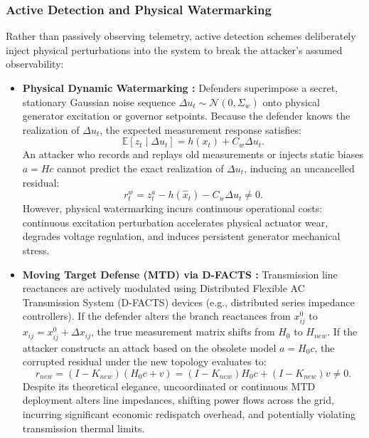 \documentclass[journal,compsoc]{IEEEtran}
\begin{document}
\subsubsection{Active Detection and Physical Watermarking}
Rather than passively observing telemetry, active detection schemes deliberately inject physical perturbations into the system to break the attacker's assumed observability:
\begin{itemize}
    \item \textbf{Physical Dynamic Watermarking \cite{ref4}:} Defenders superimpose a secret, stationary Gaussian noise sequence $\Delta u_t \sim \mathcal{N}(0, \Sigma_w)$ onto physical generator excitation or governor setpoints. Because the defender knows the realization of $\Delta u_t$, the expected measurement response satisfies:
    \begin{equation}
        \mathbb{E}[z_t \mid \Delta u_t] = h(x_t) + C_w \Delta u_t.
    \end{equation}
    An attacker who records and replays old measurements or injects static biases $a = Hc$ cannot predict the exact realization of $\Delta u_t$, inducing an uncancelled residual:
    \begin{equation}
        r_t^w = z_t^a - h(\hat{x}_t) - C_w \Delta u_t \ne 0.
    \end{equation}
    However, physical watermarking incurs continuous operational costs: continuous excitation perturbation accelerates physical actuator wear, degrades voltage regulation, and induces persistent generator mechanical stress.
    \item \textbf{Moving Target Defense (MTD) via D-FACTS \cite{ref54, ref68}:} Transmission line reactances are actively modulated using Distributed Flexible AC Transmission System (D-FACTS) devices (e.g., distributed series impedance controllers). If the defender alters the branch reactances from $x_{ij}^0$ to $x_{ij} = x_{ij}^0 + \Delta x_{ij}$, the true measurement matrix shifts from $H_0$ to $H_{new}$. If the attacker constructs an attack based on the obsolete model $a = H_0 c$, the corrupted residual under the new topology evaluates to:
    \begin{equation}
        r_{new} = (I - K_{new}) (H_0 c + v) = (I - K_{new}) H_0 c + (I - K_{new}) v \ne 0.
    \end{equation}
    Despite its theoretical elegance, uncoordinated or continuous MTD deployment alters line impedances, shifting power flows across the grid, incurring significant economic redispatch overhead, and potentially violating transmission thermal limits.
\end{itemize}
\end{document}
